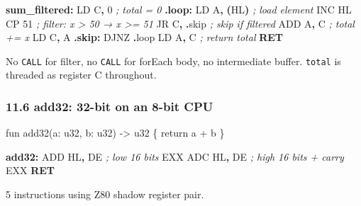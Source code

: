 \documentclass[
  11pt,
]{article}
\newenvironment{Shaded}{\begin{snugshade}}{\end{snugshade}}
\newcommand{\BuiltInTok}[1]{#1}
\newcommand{\CommentTok}[1]{\textcolor[rgb]{0.56,0.35,0.01}{\textit{#1}}}
\newcommand{\ControlFlowTok}[1]{\textcolor[rgb]{0.13,0.29,0.53}{\textbf{#1}}}
\newcommand{\DecValTok}[1]{\textcolor[rgb]{0.00,0.00,0.81}{#1}}
\newcommand{\FunctionTok}[1]{\textcolor[rgb]{0.13,0.29,0.53}{\textbf{#1}}}
\newcommand{\NormalTok}[1]{#1}
\newcommand{\OperatorTok}[1]{\textcolor[rgb]{0.81,0.36,0.00}{\textbf{#1}}}
\begin{document}
\begin{Shaded}
\begin{Highlighting}[]
\FunctionTok{sum\_filtered:}
\NormalTok{    LD C}\OperatorTok{,} \DecValTok{0}          \CommentTok{; total = 0}
\FunctionTok{.loop:}
\NormalTok{    LD A}\OperatorTok{,} \OperatorTok{(}\NormalTok{HL}\OperatorTok{)}       \CommentTok{; load element}
    \BuiltInTok{INC}\NormalTok{ HL}
\NormalTok{    CP }\DecValTok{51}            \CommentTok{; filter: x \textgreater{} 50 → x \textgreater{}= 51}
\NormalTok{    JR C}\OperatorTok{,} \OperatorTok{.}\NormalTok{skip      }\CommentTok{; skip if filtered}
    \BuiltInTok{ADD}\NormalTok{ A}\OperatorTok{,}\NormalTok{ C         }\CommentTok{; total += x}
\NormalTok{    LD C}\OperatorTok{,}\NormalTok{ A}
\FunctionTok{.skip:}
\NormalTok{    DJNZ }\OperatorTok{.}\NormalTok{loop}
\NormalTok{    LD A}\OperatorTok{,}\NormalTok{ C          }\CommentTok{; return total}
    \ControlFlowTok{RET}
\end{Highlighting}
\end{Shaded}

No \texttt{CALL} for filter, no \texttt{CALL} for forEach body, no
intermediate buffer. \texttt{total} is threaded as register C
throughout.

\hypertarget{add32-32-bit-on-an-8-bit-cpu}{%
\subsubsection{11.6 add32: 32-bit on an 8-bit
CPU}\label{add32-32-bit-on-an-8-bit-cpu}}

\begin{Shaded}
\begin{Highlighting}[]
\NormalTok{fun add32(a: u32, b: u32) {-}\textgreater{} u32 \{ return a + b \}}
\end{Highlighting}
\end{Shaded}

\begin{Shaded}
\begin{Highlighting}[]
\FunctionTok{add32:}
    \BuiltInTok{ADD}\NormalTok{ HL}\OperatorTok{,}\NormalTok{ DE      }\CommentTok{; low 16 bits}
\NormalTok{    EXX}
    \BuiltInTok{ADC}\NormalTok{ HL}\OperatorTok{,}\NormalTok{ DE      }\CommentTok{; high 16 bits + carry}
\NormalTok{    EXX}
    \ControlFlowTok{RET}
\end{Highlighting}
\end{Shaded}

5 instructions using Z80 shadow register pair.
\end{document}
